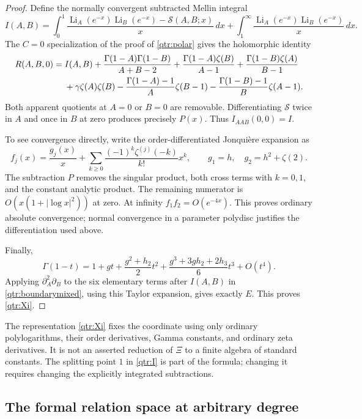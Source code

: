 \begin{proof}
Define the normally convergent subtracted Mellin integral
\[
 I(A,B)=\int_0^1
 \frac{\operatorname{Li}_A(e^{-x})\operatorname{Li}_B(e^{-x})
                    -\mathcal S(A,B;x)}{x}\,dx
 +\int_1^\infty
 \frac{\operatorname{Li}_A(e^{-x})\operatorname{Li}_B(e^{-x})}{x}\,dx.
\]
The \(C=0\) specialization of the proof of \eqref{qtr:polar} gives
the holomorphic identity
\begin{align}
 R(A,B,0)={}&I(A,B)
 +\frac{\Gamma(1-A)\Gamma(1-B)}{A+B-2}
 +\frac{\Gamma(1-A)\zeta(B)}{A-1}
 +\frac{\Gamma(1-B)\zeta(A)}{B-1}\notag\\
 &+\gamma\zeta(A)\zeta(B)
 -\frac{\Gamma(1-A)-1}{A}\zeta(B-1)
 -\frac{\Gamma(1-B)-1}{B}\zeta(A-1).
 \label{qtr:boundarymixed}
\end{align}
Both apparent quotients at \(A=0\) or \(B=0\) are removable.
Differentiating \(\mathcal S\) twice in \(A\) and once in \(B\)
at zero produces precisely \(P(x)\). Thus
\(I_{AAB}(0,0)=I\).

To see convergence directly, write the order-differentiated
Jonqui\`ere expansion as
\[
 f_j(x)=\frac{g_j(x)}{x}
       +\sum_{k\ge0}\frac{(-1)^k\zeta^{(j)}(-k)}{k!}x^k,
 \qquad
 g_1=h,\quad g_2=h^2+\zeta(2).
\]
The subtraction \(P\) removes the singular product, both
cross terms with \(k=0,1\), and the constant analytic product.
The remaining numerator is
\(O(x(1+|\log x|^2))\) at zero. At infinity
\(f_1f_2=O(e^{-4x})\). This proves ordinary absolute convergence;
normal convergence in a parameter polydisc justifies the
differentiation used above.

Finally,
\[
 \Gamma(1-t)=1+gt+\frac{g^2+h_2}{2}t^2
               +\frac{g^3+3gh_2+2h_3}{6}t^3+O(t^4).
\]
Applying \(\partial_A^2\partial_B\) to the six elementary
terms after \(I(A,B)\) in \eqref{qtr:boundarymixed}, using this
Taylor expansion, gives exactly \(E\). This proves
\eqref{qtr:Xi}.
\end{proof}

The representation \eqref{qtr:Xi} fixes the coordinate using only
ordinary polylogarithms, their order derivatives, Gamma constants,
and ordinary zeta derivatives. It is not an asserted reduction
of \(\Xi\) to a finite algebra of standard constants.
The splitting point \(1\) in \eqref{qtr:I} is part of the formula;
changing it requires changing the explicitly integrated
subtractions.

\subsection{The formal relation space at arbitrary degree}

